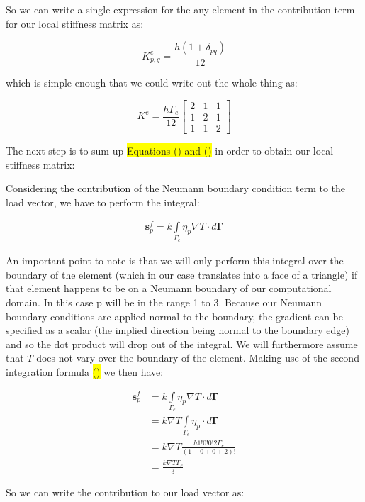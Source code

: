\documentclass[12pt]{article}
\newcommand{\hilight}[1]{\colorbox{yellow}{#1}}
\begin{document}
So we can write a single expression for the any element in the contribution term for our local stiffness matrix as:

$$
K_{p,q}^e = \frac{h (1+\delta_{pq})}{12}
$$

which is simple enough that we could write out the whole thing as:

\begin{equation}
K^e = \frac{h \Gamma_e}{12}{\begin{bmatrix} 2 & 1 & 1  \\ 1 & 2 & 1  \\ 1 & 1 & 2 \end{bmatrix}}
\end{equation}

The next step is to sum up \hilight{Equations () and ()} in order to obtain our local stiffness matrix:


Considering the contribution of the Neumann boundary condition term to
the load vector, we have to perform the integral:

\begin{align*}
 \mathbf{s}_p^f = k \int\limits_{\Gamma_{e}}{\eta_p\nabla T} \cdot d \mathbf{\Gamma}
\end{align*}

An important point to note is that we will only perform this integral over the boundary of the element (which in our case translates into a  face of a triangle) if that element happens to be on a Neumann boundary of our computational domain. In this case p will be in the range 1 to 3. Because our Neumann boundary conditions are applied normal to the boundary, the gradient can be specified as a scalar (the implied direction being normal to the boundary edge) and so the dot product will drop out of the integral. We will furthermore assume that $T$ does not vary over the boundary of the element. Making use of the second integration formula \hilight{()} we then have:

\begin{align*}
 \mathbf{s}_p^f &= k \int\limits_{\Gamma_{e}}{\eta_p\nabla T} \cdot d \mathbf{\Gamma} \\
 &= k \nabla T \int\limits_{\Gamma_{e}}{\eta_p} \cdot d \mathbf{\Gamma} \\
 &= k \nabla T \frac{h 1!0!0!2\Gamma_e}{(1+0+0+2)!} \\
 &= \frac{k\nabla T\Gamma_e}{3}
\end{align*}

So we can write the contribution to our load vector as:
\end{document}
